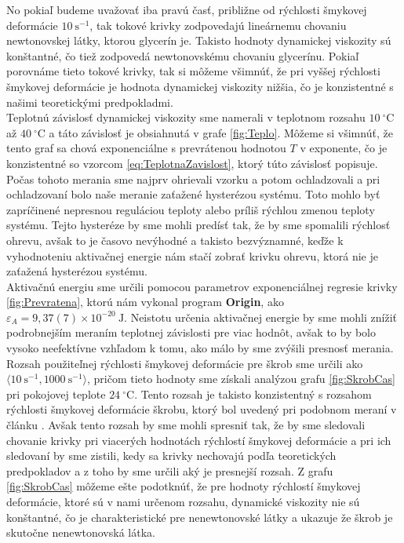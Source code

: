 \documentclass{prepareprotokol} %
\begin{document}
No pokiaľ budeme uvažovať iba pravú časť, približne od rýchlosti šmykovej deformácie $10~\mathrm{s}^{-1}$, tak tokové krivky zodpovedajú lineárnemu chovaniu newtonovskej látky, ktorou glycerín je. 
Takisto hodnoty dynamickej viskozity sú konštantné, čo tiež zodpovedá newtonovskému chovaniu glycerínu.
Pokiaľ porovnáme tieto tokové krivky, tak si môžeme všimnúť, že pri vyššej rýchlosti šmykovej deformácie je hodnota dynamickej viskozity nižšia, čo je konzistentné s našimi teoretickými predpokladmi.\\

Teplotnú závislosť dynamickej viskozity sme namerali v teplotnom rozsahu $10~^\circ \mathrm{C}$ až $40~^\circ \mathrm{C}$ a táto závislosť je obsiahnutá v grafe \ref{fig:Teplo}. 
Môžeme si všimnúť, že tento graf sa chová exponenciálne s prevrátenou hodnotou $T$ v exponente, čo je konzistentné so vzorcom \ref{eq:TeplotnaZavislost}, ktorý túto závislosť popisuje. 
Počas tohoto merania sme najprv ohrievali vzorku a potom ochladzovali a pri ochladzovaní bolo naše meranie zaťažené hysterézou systému. 
Toto mohlo byť zapríčinené nepresnou reguláciou teploty alebo príliš rýchlou zmenou teploty systému. 
Tejto hysteréze by sme mohli predísť tak, že by sme spomalili rýchlosť ohrevu, avšak to je časovo nevýhodné a takisto bezvýznamné, keďže k vyhodnoteniu aktivačnej energie nám stačí zobrať krivku ohrevu, ktorá nie je zaťažená hysterézou systému.\\

Aktivačnú energiu sme určili pomocou parametrov exponenciálnej regresie krivky \ref{fig:Prevratena}, ktorú nám vykonal program \textbf{Origin}, ako $\varepsilon_A = 9,37(7)\times10^{-20}~\mathrm{J}$. 
Neistotu určenia aktivačnej energie by sme mohli znížiť podrobnejším meraním teplotnej závislosti pre viac hodnôt, avšak to by bolo vysoko neefektívne vzhľadom k tomu, ako málo by sme zvýšili presnosť merania.\\

Rozsah použiteľnej rýchlosti šmykovej deformácie pre škrob sme určili ako $\langle 10~\mathrm{s}^{-1}, 1000~\mathrm{s}^{-1}\rangle$, pričom tieto hodnoty sme získali analýzou grafu \ref{fig:SkrobCas} pri pokojovej teplote $24~^\circ \mathrm{C}$. 
Tento rozsah je takisto konzistentný s rozsahom rýchlosti šmykovej deformácie škrobu, ktorý bol uvedený pri podobnom meraní v článku \cite{Skrob}. 
Avšak tento rozsah by sme mohli spresniť tak, že by sme sledovali chovanie krivky pri viacerých hodnotách rýchlostí šmykovej deformácie a pri ich sledovaní by sme zistili, kedy sa krivky nechovajú podľa teoretických predpokladov a z toho by sme určili aký je presnejší rozsah. 
Z grafu \ref{fig:SkrobCas} môžeme ešte podotknúť, že pre hodnoty rýchlostí šmykovej deformácie, ktoré sú v nami určenom rozsahu, dynamické viskozity nie sú konštantné, čo je charakteristické pre nenewtonovské látky a ukazuje že škrob je skutočne nenewtonovská látka.\\
\end{document}
